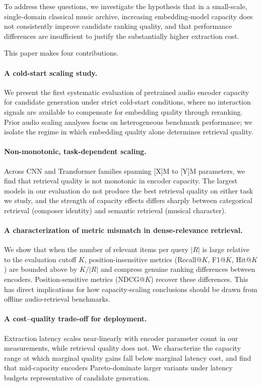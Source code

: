 \documentclass[sigconf]{acmart}
\begin{document}
To address these questions, we investigate the hypothesis that in a small-scale, single-domain classical music archive, increasing embedding-model capacity does not consistently improve candidate ranking quality, and that performance differences are insufficient to justify the substantially higher extraction cost. 

This paper makes four contributions.

\paragraph{A cold-start scaling study.}
We present the first systematic evaluation of pretrained audio
encoder capacity for candidate generation under strict cold-start
conditions, where no interaction signals are available to compensate
for embedding quality through reranking. Prior audio scaling analyses
focus on heterogeneous benchmark performance; we isolate the regime
in which embedding quality alone determines retrieval quality.

\paragraph{Non-monotonic, task-dependent scaling.}
Across CNN and Transformer families spanning [X]M to [Y]M parameters,
we find that retrieval quality is not monotonic in encoder capacity.
The largest models in our evaluation do not produce the best
retrieval quality on either task we study, and the strength of
capacity effects differs sharply between categorical retrieval
(composer identity) and semantic retrieval (musical character).

\paragraph{A characterization of metric mismatch in dense-relevance retrieval.}
We show that when the number of relevant items per query $|R|$ is
large relative to the evaluation cutoff $K$, position-insensitive
metrics (Recall@$K$, F1@$K$, Hit@$K$) are bounded above by $K/|R|$
and compress genuine ranking differences between encoders.
Position-sensitive metrics (NDCG@$K$) recover these differences.
This has direct implications for how capacity-scaling conclusions
should be drawn from offline audio-retrieval benchmarks.

\paragraph{A cost--quality trade-off for deployment.}
Extraction latency scales near-linearly with encoder parameter count
in our measurements, while retrieval quality does not. We
characterize the capacity range at which marginal quality gains fall
below marginal latency cost, and find that mid-capacity encoders
Pareto-dominate larger variants under latency budgets representative
of candidate generation.
\end{document}
